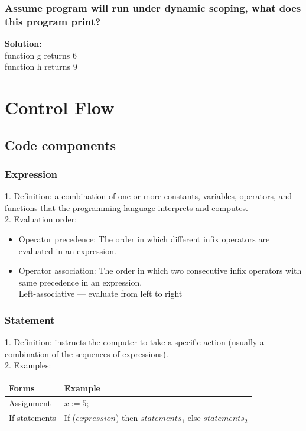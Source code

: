 \documentclass[11pt]{article}
\begin{document}
\subsubsection{Assume program will run under dynamic scoping, what does this program print?}
\textbf{Solution:} \\
function g returns 6\\
function h returns 9

\section{Control Flow}
\subsection{Code components}
\subsubsection{Expression}
1. Definition: a combination of one or more constants, variables, operators, and functions that the programming language interprets and computes.\\
2. Evaluation order:
\begin{itemize}
\item Operator precedence: The order in which different infix operators are evaluated in an expression.
\item Operator association: The order in which two consecutive infix operators with same precedence in an expression.\\
	Left-associative --- evaluate from left to right
\end{itemize}
\subsubsection{Statement}
1. Definition: instructs the computer to take a specific action (usually a combination of the sequences of expressions).\\
2. Examples:\\
\begin{center}
\begin{tabular}{ |l|l|} 
 \hline
 Forms & Example \\ 
  \hline
 Assignment & $x:=5;$ \\ 
  \hline
 If statements & If ($expression$) then $statements_1$ else $statements_2$\\ 
 \hline
\end{tabular}
\end{center}
\end{document}
